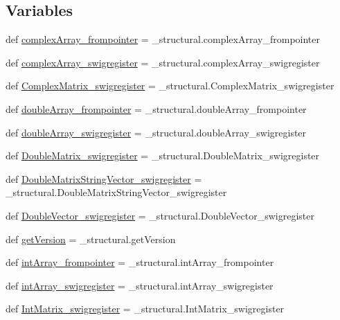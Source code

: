 \subsection*{Variables}
\begin{DoxyCompactItemize}
\item 
def \hyperlink{namespacestructural_a3eb708ca36b1ff0d25fc72811acbb38d}{complex\+Array\+\_\+frompointer} = \+\_\+structural.\+complex\+Array\+\_\+frompointer
\item 
def \hyperlink{namespacestructural_a581823691d26a9d2dcb4f8f05131e43a}{complex\+Array\+\_\+swigregister} = \+\_\+structural.\+complex\+Array\+\_\+swigregister
\item 
def \hyperlink{namespacestructural_a004655d11c57ba0006c07cf4980f296f}{Complex\+Matrix\+\_\+swigregister} = \+\_\+structural.\+Complex\+Matrix\+\_\+swigregister
\item 
def \hyperlink{namespacestructural_a0f6818d3470f65d04dc0700127d4b978}{double\+Array\+\_\+frompointer} = \+\_\+structural.\+double\+Array\+\_\+frompointer
\item 
def \hyperlink{namespacestructural_a241f62a8e948519ab424201f4b7d7d5b}{double\+Array\+\_\+swigregister} = \+\_\+structural.\+double\+Array\+\_\+swigregister
\item 
def \hyperlink{namespacestructural_a4a0d236536afce5f8551d555bf5805d5}{Double\+Matrix\+\_\+swigregister} = \+\_\+structural.\+Double\+Matrix\+\_\+swigregister
\item 
def \hyperlink{namespacestructural_afd3846ef961fa0b5d0085ecfe84d6e3c}{Double\+Matrix\+String\+Vector\+\_\+swigregister} = \+\_\+structural.\+Double\+Matrix\+String\+Vector\+\_\+swigregister
\item 
def \hyperlink{namespacestructural_af854863c46021dca144354de5da0125a}{Double\+Vector\+\_\+swigregister} = \+\_\+structural.\+Double\+Vector\+\_\+swigregister
\item 
def \hyperlink{namespacestructural_a0bbaa326887179c3bc058f974353a05d}{get\+Version} = \+\_\+structural.\+get\+Version
\item 
def \hyperlink{namespacestructural_a0ac54a1236c7722636f281084c397c64}{int\+Array\+\_\+frompointer} = \+\_\+structural.\+int\+Array\+\_\+frompointer
\item 
def \hyperlink{namespacestructural_a84908312e0a0774494ef4b2edb67dfbc}{int\+Array\+\_\+swigregister} = \+\_\+structural.\+int\+Array\+\_\+swigregister
\item 
def \hyperlink{namespacestructural_a2e57dddc5a2584f9b03e238237358393}{Int\+Matrix\+\_\+swigregister} = \+\_\+structural.\+Int\+Matrix\+\_\+swigregister

\end{DoxyCompactItemize}
